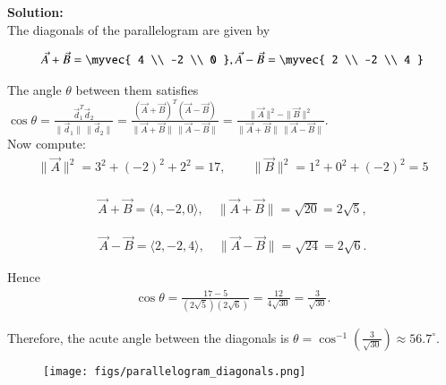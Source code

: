 \documentclass[journal]{IEEEtran}
\begin{document}
\textbf{Solution:}\\
The diagonals of the parallelogram are given by\\
\begin{center}
\begin{align}
\vec{A} + \vec{B} =
\myvec{
4 \\
-2 \\
0
}
, \vec{A} - \vec{B} =
\myvec{
2 \\
-2 \\
4
}
\end{align}

The angle $\theta$ between them satisfies
$
\cos\theta 
= \frac{\vec{d}_1 ^{T}\vec{d}_2}{\|\vec{d}_1\| \, \|\vec{d}_2\|}
= \frac{(\vec{A}+\vec{B})^{T}(\vec{A}-\vec{B})}{\|\vec{A}+\vec{B}\| \, \|\vec{A}-\vec{B}\|}
= \frac{\|\vec{A}\|^2 - \|\vec{B}\|^2}{\|\vec{A}+\vec{B}\| \, \|\vec{A}-\vec{B}\|}.
$\\
\vspace{0.3cm}
Now compute:
\begin{align}
\|\vec{A}\|^2 = 3^2 + (-2)^2 + 2^2 = 17,
\qquad
\|\vec{B}\|^2 = 1^2 + 0^2 + (-2)^2 = 5
\end{align}
\\
\vspace{0.3cm}
\begin{align}
    \vec{A} + \vec{B} = \langle 4, -2, 0 \rangle, 
\quad \|\vec{A}+\vec{B}\| = \sqrt{20} = 2\sqrt{5},
\end{align}

\begin{align}
    \vec{A} - \vec{B} = \langle 2, -2, 4 \rangle, 
\quad \|\vec{A}-\vec{B}\| = \sqrt{24} = 2\sqrt{6}.
\end{align}

Hence
\begin{align}
    \cos\theta 
= \frac{17 - 5}{(2\sqrt{5})(2\sqrt{6})} 
= \frac{12}{4\sqrt{30}} 
= \frac{3}{\sqrt{30}}.
\end{align}



\vspace{0.3cm}
Therefore, the acute angle between the diagonals is
$
\theta = \cos^{-1}\!\left(\frac{3}{\sqrt{30}}\right) \approx 56.7^\circ.
$

\begin{figure}
    \centering
    \texttt{[image: figs/parallelogram\_diagonals.png]}
    \caption{}
    \label{fig:placeholder}
\end{figure}








\end{center}
\end{document}
